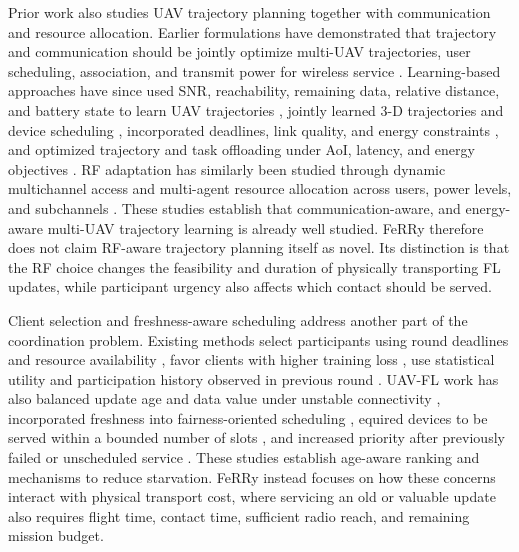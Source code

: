 \documentclass[conference]{IEEEtran}
\newcommand{\sysname}{FeRRy}
\begin{document}
Prior work also studies UAV trajectory planning together with communication
and resource allocation. Earlier formulations have demonstrated that trajectory and communication should be jointly optimize multi-UAV trajectories, user scheduling, association, and transmit power for wireless service \cite{wu2018joint}. Learning-based approaches have since used SNR,
reachability, remaining data, relative distance, and battery state to learn UAV
trajectories \cite{chen2023model}, jointly learned 3-D trajectories and device
scheduling \cite{gao2024federated}, incorporated deadlines, link quality, and
energy constraints \cite{mondal2025deep}, and optimized trajectory and task
offloading under AoI, latency, and energy objectives
\cite{wang2025joint,kumar2026battery}. RF adaptation has similarly been studied
through dynamic multichannel access \cite{wang2018deep} and multi-agent
resource allocation across users, power levels, and subchannels
\cite{cui2019multi}. These studies establish that communication-aware, and energy-aware multi-UAV trajectory learning is already well studied. \sysname{} therefore does not claim RF-aware trajectory
planning itself as novel. Its distinction is that the RF choice changes the
feasibility and duration of physically transporting FL updates, while
participant urgency also affects which contact should be served.

Client selection and freshness-aware scheduling address another part of the coordination
problem. Existing methods select participants using round deadlines and
resource availability \cite{nishio2019client}, favor clients with higher training loss
\cite{cho2022towards}, use statistical utility and participation history observed in
previous round \cite{lai2021oort}. UAV-FL work has also balanced update age and data value
under unstable connectivity \cite{cui2023data}, incorporated freshness into
fairness-oriented scheduling \cite{zhu2024fairness}, equired devices to be served
within a bounded number of slots \cite{zhai2024uav}, and increased priority after previously failed or
unscheduled service \cite{mestoukirdi2022uav}. These studies establish age-aware ranking and mechanisms to reduce starvation. \sysname{} instead focuses on how these concerns interact with physical transport cost, where servicing an old or valuable update also requires flight time, contact time, sufficient radio reach, and remaining mission budget. 
\end{document}
